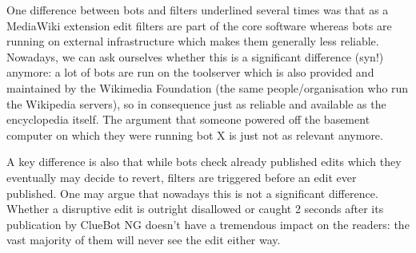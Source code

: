\begin{comment}
maybe it's a historical phenomenon (in many regards):
* perhaps there were differences that are not essential anymore, such as:
  * on which infrastructure does it run (part of the core software vs own computers of the bot operators)
  * filters are triggered *before* an edit is even published, whereas bots (and tools) can revert an edit post factum. Is this really an important difference in times when bots need a couple of seconds to revert an edit?
* perhaps the extension was implemented because someone was capable of implementing and working well with this type of systems so they just went and did it (do-ocracy; Wikipedia as a collaborative volunteer project);
* perhaps it still exists in times of fancier machine learning based tools (or bots) because rule-based systems are more transparent/easily understandable for humans and writing a regex is simpler than coding a bot.
* hypothesis: it is easier to set up a filter than program a bot. Setting up a filter requires "only" understanding of regular expressions. Programming a bot requires knowledge of a programming language and understanding of the API.
\end{comment}

One difference between bots and filters underlined several times was that as a MediaWiki extension edit filters are part of the core software whereas bots are running on external infrastructure which makes them generally less reliable.
Nowadays, we can ask ourselves whether this is a significant difference (syn!) anymore:
a lot of bots are run on the toolserver which is also provided and maintained by the Wikimedia Foundation (the same people/organisation who run the Wikipedia servers), so in consequence just as reliable and available as the encyclopedia itself.
The argument that someone powered off the basement computer on which they were running bot X is just not as relevant anymore.


A key difference is also that while bots check already published edits which they eventually may decide to revert, filters are triggered before an edit ever published.
One may argue that nowadays this is not a significant difference.
Whether a disruptive edit is outright disallowed or caught 2 seconds after its publication by ClueBot NG doesn't have a tremendous impact on the readers:
the vast majority of them will never see the edit either way.


